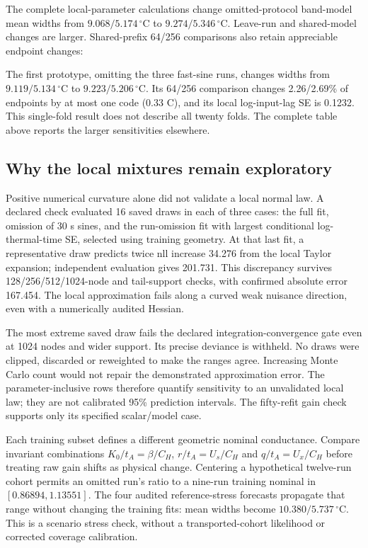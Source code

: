 \documentclass[10pt,letterpaper]{article}
\newcommand{\C}{\,^\circ\mathrm{C}}
\begin{document}
The complete local-parameter calculations change omitted-protocol band-model
mean widths from $9.068/5.174\C$ to $9.274/5.346\C$. Leave-run and shared-model
changes are larger. Shared-prefix 64/256 comparisons also retain appreciable
endpoint changes:



The first prototype, omitting the three fast-sine runs, changes widths from
$9.119/5.134\C$ to $9.223/5.206\C$. Its 64/256 comparison changes
2.26/2.69\% of endpoints by at most one code (0.33 C), and its local log-input-lag
SE is 0.1232. This single-fold result does not describe all twenty folds.
The complete table above reports the larger sensitivities elsewhere.

\subsection*{Why the local mixtures remain exploratory}
Positive numerical curvature alone did not validate a local normal law.
A declared check evaluated 16 saved draws in each of three cases: the full
fit, omission of 30 s sines, and the run-omission fit with largest conditional
log-thermal-time SE, selected using training geometry. At that last fit,
a representative draw predicts twice nll increase 34.276 from the local
Taylor expansion; independent evaluation gives 201.731. This discrepancy
survives 128/256/512/1024-node and tail-support checks, with confirmed
absolute error 167.454. The local approximation fails along a curved weak
nuisance direction, even with a numerically audited Hessian.

The most extreme saved draw fails the declared integration-convergence gate
even at 1024 nodes and wider support. Its precise deviance is withheld.
No draws were clipped, discarded or reweighted to make the ranges agree.
Increasing Monte Carlo count would not repair the demonstrated approximation
error. The parameter-inclusive rows therefore quantify sensitivity to an
unvalidated local law; they are not calibrated 95\% prediction intervals.
The fifty-refit gain check supports only its specified scalar/model case.

Each training subset defines a different geometric nominal conductance.
Compare invariant combinations $K_0/t_A=\beta/C_H$, $r/t_A=U_s/C_H$ and
$q/t_A=U_x/C_H$ before treating raw gain shifts as physical change. Centering
a hypothetical twelve-run cohort permits an omitted run's ratio to a nine-run
training nominal in $[0.86894,1.13551]$. The four audited reference-stress
forecasts propagate that range without changing the training fits: mean
widths become $10.380/5.737\C$. This is a scenario stress check, without a
transported-cohort likelihood or corrected coverage calibration.
\end{document}
